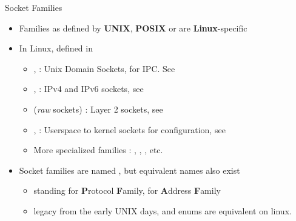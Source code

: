 \begin{frame}{Socket Families}
	\vspace{1cm}
	\begin{itemize}
		\item Families as defined by \textbf{UNIX}, \textbf{POSIX} or are \textbf{Linux}-specific
		\item In Linux, defined in 
			\begin{itemize}
				\item {},  : Unix Domain Sockets, for IPC. See 
				\item {},  : IPv4 and IPv6 sockets, see 
				\item {} (\textit{raw} sockets) : Layer 2 sockets, see 
				\item {},  : Userspace to kernel sockets for configuration, see 
				\item More specialized families : , , , etc.
			\end{itemize}
		\item Socket families are named , but equivalent names  also exist
			\begin{itemize}
				\item {} standing for \textbf{P}rotocol \textbf{F}amily,  for \textbf{A}ddress \textbf{F}amily
				\item legacy from the early UNIX days,  and  enums are equivalent on linux.
			\end{itemize}
	\end{itemize}
\end{frame}

